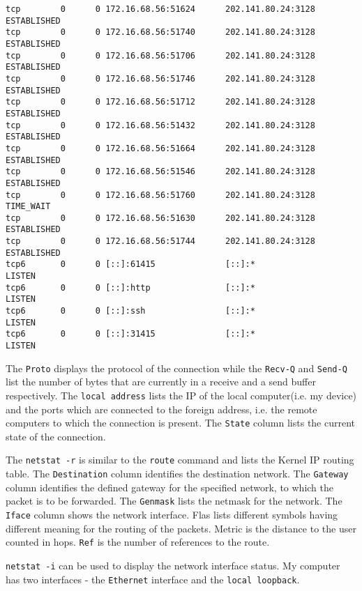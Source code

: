 \documentclass{article}
\begin{document}
\begin{verbatim}
tcp        0      0 172.16.68.56:51624      202.141.80.24:3128      ESTABLISHED
tcp        0      0 172.16.68.56:51740      202.141.80.24:3128      ESTABLISHED
tcp        0      0 172.16.68.56:51706      202.141.80.24:3128      ESTABLISHED
tcp        0      0 172.16.68.56:51746      202.141.80.24:3128      ESTABLISHED
tcp        0      0 172.16.68.56:51712      202.141.80.24:3128      ESTABLISHED
tcp        0      0 172.16.68.56:51432      202.141.80.24:3128      ESTABLISHED
tcp        0      0 172.16.68.56:51664      202.141.80.24:3128      ESTABLISHED
tcp        0      0 172.16.68.56:51546      202.141.80.24:3128      ESTABLISHED
tcp        0      0 172.16.68.56:51760      202.141.80.24:3128      TIME_WAIT  
tcp        0      0 172.16.68.56:51630      202.141.80.24:3128      ESTABLISHED
tcp        0      0 172.16.68.56:51744      202.141.80.24:3128      ESTABLISHED
tcp6       0      0 [::]:61415              [::]:*                  LISTEN     
tcp6       0      0 [::]:http               [::]:*                  LISTEN     
tcp6       0      0 [::]:ssh                [::]:*                  LISTEN     
tcp6       0      0 [::]:31415              [::]:*                  LISTEN     

\end{verbatim}
\normalsize
The \texttt{Proto} displays the protocol of the connection while the \texttt{Recv-Q} and \texttt{Send-Q} list the number of bytes that are currently in a receive and a send buffer respectively. The \texttt{local address} lists the IP of the local computer(i.e. my device) and the ports which are connected to the foreign address, i.e. the remote computers to which the connection is present. The \texttt{State} column lists the current state of the connection. 

The \texttt{netstat -r} is similar to the \texttt{route} command and lists the Kernel IP routing table. The \texttt{Destination} column identifies the destination network. The \texttt{Gateway} column identifies the defined gateway for the specified network, to which the packet is to be forwarded. The \texttt{Genmask} lists the netmask for the network. The \texttt{Iface} column shows the network interface. Flas lists different symbols having different meaning for the routing of the packets. Metric is the distance to the user counted in hops. \texttt{Ref} is the number of references to the route. 

\texttt{netstat -i} can be used to display the network interface status. My computer has two interfaces - the \texttt{Ethernet} interface and the \texttt{local loopback}. 
\end{document}
